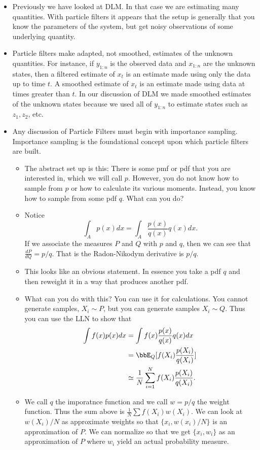 \documentclass{article}
\begin{document}
\begin{itemize}
\item Previously we have looked at DLM.  In that case we are estimating many quantities.  With particle filters it appears that the setup is generally that you know the parameters of the system, but get noisy observations of some underlying quantity.  
\item Particle filters make adapted, not smoothed, estimates of the unknown quantities.  For instance, if $y_{1:n}$ is the observed data and $x_{1:n}$ are the unknown states, then a filtered estimate of $x_t$ is an estimate made using only the data up to time $t$.  A smoothed estimate of $x_t$ is an estimate made using data at times greater than $t$.  In our discussion of DLM we made smoothed estimates of the unknown states because we used all of $y_{1:n}$ to estimate states such as $z_1, z_2$, etc.
\item Any discussion of Particle Filters must begin with importance sampling.  Importance sampling is the foundational concept upon which particle filters are built.
\begin{itemize}
\item The abstract set up is this:  There is some pmf or pdf that you are interested in, which we will call $p$.  However, you do not know how to sample from $p$ or how to calculate its various moments.  Instead, you know how to sample from some pdf $q$.  What can you do?
\item Notice 
\[
\int_A p(x) dx = \int_A \frac{p(x)}{q(x)} q(x) dx.
\]
If we associate the measures $P$ and $Q$ with $p$ and $q$, then we can see that $\frac{dP}{dQ} = p/q$.  That is the Radon-Nikodym derivative is $p/q$.
\item This looks like an obvious statement.  In essence you take a pdf $q$ and then reweight it in a way that produces another pdf.
\item What can you do with this?  You can use it for calculations.  You cannot generate samples, $X_i \sim P$, but you can generate samples $X_i \sim Q$.  Thus you can use the LLN to show that
\begin{align*}
\int f(x) p(x) dx & = \int f(x) \frac{p(x)}{q(x)} q(x) dx \\
& = \bbE_Q[ f(X_i) \frac{p(X_i)}{q(X_i)} ] \\
& \simeq \frac{1}{N} \sum_{i=1}^N f(X_i) \frac{p(X_i)}{q(X_i)}.
\end{align*}
\item We call $q$ the imporatnce function and we call $w = p/q$ the weight function.  Thus the sum above is $\frac{1}{N} \sum f(X_i) w(X_i)$.  We can look at $w(X_i)/N$ as approximate weights so that $\{x_i, w(x_i)/N\}$ is an approximation of $P$.  We can normalize so that we get $\{x_i, w_i\}$ as an approximation of $P$ where $w_i$ yield an actual probability measure. 

\end{itemize}
\end{itemize}
\end{document}
